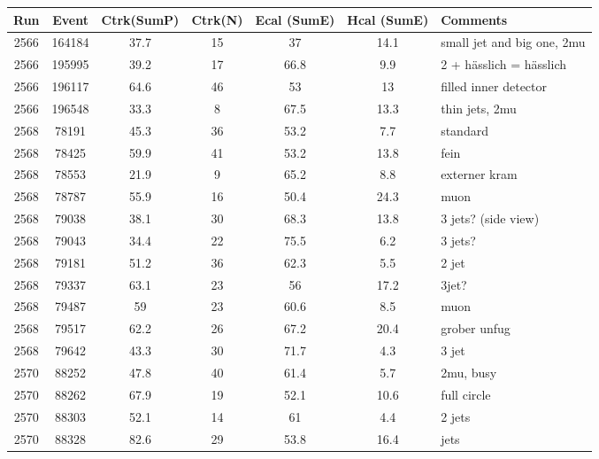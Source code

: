 \begin{tabular}{ccccccl}
	\toprule
	Run & Event & Ctrk(SumP) & Ctrk(N) & Ecal (SumE) & Hcal (SumE) & Comments \\
	\midrule
	2566 & 164184 & 37.7 & 15 & 37   & 14.1 & small jet and big one, 2mu \\
	2566 & 195995 & 39.2 & 17 & 66.8 & 9.9  & 2 + hässlich = hässlich    \\
	2566 & 196117 & 64.6 & 46 & 53   & 13   & filled inner detector      \\
	2566 & 196548 & 33.3 & 8  & 67.5 & 13.3 & thin jets, 2mu             \\
	2568 & 78191  & 45.3 & 36 & 53.2 & 7.7  & standard                   \\
	2568 & 78425  & 59.9 & 41 & 53.2 & 13.8 & fein                       \\
	2568 & 78553  & 21.9 & 9  & 65.2 & 8.8  & externer kram              \\
	2568 & 78787  & 55.9 & 16 & 50.4 & 24.3 & muon                       \\
	2568 & 79038  & 38.1 & 30 & 68.3 & 13.8 & 3 jets? (side view)        \\
	2568 & 79043  & 34.4 & 22 & 75.5 & 6.2  & 3 jets?                    \\
	2568 & 79181  & 51.2 & 36 & 62.3 & 5.5  & 2 jet                      \\
	2568 & 79337  & 63.1 & 23 & 56   & 17.2 & 3jet?                      \\
	2568 & 79487  & 59   & 23 & 60.6 & 8.5  & muon                       \\
	2568 & 79517  & 62.2 & 26 & 67.2 & 20.4 & grober unfug               \\
	2568 & 79642  & 43.3 & 30 & 71.7 & 4.3  & 3 jet                      \\
	2570 & 88252  & 47.8 & 40 & 61.4 & 5.7  & 2mu, busy                  \\
	2570 & 88262  & 67.9 & 19 & 52.1 & 10.6 & full circle                \\
	2570 & 88303  & 52.1 & 14 & 61   & 4.4  & 2 jets                     \\
	2570 & 88328  & 82.6 & 29 & 53.8 & 16.4 & jets                  	 \\
	\bottomrule
\end{tabular}